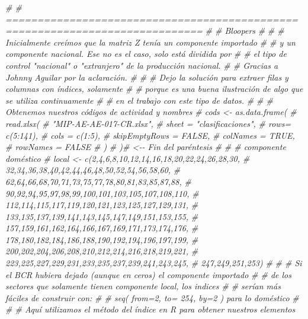 \documentclass[
]{article}
\newenvironment{Shaded}{\begin{snugshade}}{\end{snugshade}}
\newcommand{\CommentTok}[1]{\textcolor[rgb]{0.56,0.35,0.01}{\textit{#1}}}
\begin{document}
\begin{Shaded}
\begin{Highlighting}[]
\CommentTok{\# \# =============================================================================}
\CommentTok{\# \# Bloopers}
\CommentTok{\# }
\CommentTok{\# \# Inicialmente creímos que la matriz Z tenía un componente importado}
\CommentTok{\# \# y un componente nacional. Ese no es el caso, solo está dividida por}
\CommentTok{\# \# el tipo de control "nacional" o "extranjero" de la producción nacional.}
\CommentTok{\# \# Gracias a Johnny Aguilar por la aclaración.}
\CommentTok{\# }
\CommentTok{\# \# Dejo la solución para extraer filas y columnas con índices, solamente}
\CommentTok{\# \# porque es una buena ilustración de algo que se utiliza continuamente}
\CommentTok{\# \# en el trabajo con este tipo de datos.}
\CommentTok{\# }
\CommentTok{\# \# Obtenemos nuestros códigos de actividad y nombres}
\CommentTok{\# cods \textless{}{-} as.data.frame(}
\CommentTok{\#   read.xlsx(}
\CommentTok{\#     "MIP{-}AE{-}AE{-}017{-}CR.xlsx",}
\CommentTok{\#     sheet = "clasificaciones", }
\CommentTok{\#     rows= c(5:141), }
\CommentTok{\#     cols = c(1:5), }
\CommentTok{\#     skipEmptyRows = FALSE, }
\CommentTok{\#     colNames = TRUE, }
\CommentTok{\#     rowNames = FALSE}
\CommentTok{\#   )}
\CommentTok{\# )\# \textless{}{-}{-} Fin del paréntesis}
\CommentTok{\# }
\CommentTok{\# \# componente doméstico}
\CommentTok{\# local \textless{}{-} c(2,4,6,8,10,12,14,16,18,20,22,24,26,28,30, }
\CommentTok{\#            32,34,36,38,40,42,44,46,48,50,52,54,56,58,60, }
\CommentTok{\#            62,64,66,68,70,71,73,75,77,78,80,81,83,85,87,88, }
\CommentTok{\#            90,92,94,95,97,98,99,100,101,103,105,107,108,110, }
\CommentTok{\#            112,114,115,117,119,120,121,123,125,127,129,131, }
\CommentTok{\#            133,135,137,139,141,143,145,147,149,151,153,155, }
\CommentTok{\#            157,159,161,162,164,166,167,169,171,173,174,176, }
\CommentTok{\#            178,180,182,184,186,188,190,192,194,196,197,199, }
\CommentTok{\#            200,202,204,206,208,210,212,214,216,218,219,221, }
\CommentTok{\#            223,225,227,229,231,233,235,237,239,241,243,245, }
\CommentTok{\#            247,249,251,253)}
\CommentTok{\# }
\CommentTok{\# \# Si el BCR hubiera dejado (aunque en ceros) el componente importado}
\CommentTok{\# \# de los sectores que solamente tienen componente local, los indices}
\CommentTok{\# \# serían más fáciles de construir con:}
\CommentTok{\# \# seq( from=2, to= 254, by=2 ) para lo doméstico }
\CommentTok{\# }
\CommentTok{\# \# Aquí utilizamos el método del índice en R para obtener nuestros elementos}

\end{Highlighting}
\end{Shaded}
\end{document}
